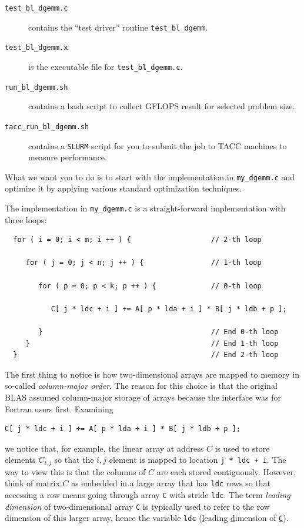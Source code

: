 \begin{description}
\begin{description}
\item[{\tt test\_bl\_dgemm.c}] contains the ``test driver'' routine {\tt test\_bl\_dgemm}. 
\item[{\tt test\_bl\_dgemm.x}] is the executable file for {\tt test\_bl\_dgemm.c}. 
\item[{\tt run\_bl\_dgemm.sh}] contains a bash script to collect GFLOPS result for selected problem size.
\item[{\tt tacc\_run\_bl\_dgemm.sh}] contains a {\tt SLURM} script for you to submit the job to TACC machines to measure performance.
\end{description}
\item[{\tt }]
\end{description}



What we want you to do is to start with the implementation in {\tt my\_dgemm.c} and optimize it by applying various standard optimization techniques.



The implementation in {\tt my\_dgemm.c} is a straight-forward implementation with three loops:
\begin{verbatim}
  for ( i = 0; i < m; i ++ ) {                   // 2-th loop
  
     for ( j = 0; j < n; j ++ ) {                // 1-th loop
  
        for ( p = 0; p < k; p ++ ) {             // 0-th loop
  
           C[ j * ldc + i ] += A[ p * lda + i ] * B[ j * ldb + p ];
  
        }                                        // End 0-th loop
     }                                           // End 1-th loop
  }                                              // End 2-th loop
\end{verbatim}
The first thing to notice is how two-dimensional arrays are mapped to memory in so-called {\em column-major order}.  The reason for this choice is that the original BLAS assumed column-major storage of arrays because the interface was for Fortran users first.  
Examining
\begin{verbatim}
C[ j * ldc + i ] += A[ p * lda + i ] * B[ j * ldb + p ];
\end{verbatim}
we notice that, for example, the linear array at address $ C $ is used to store elements $ C_{i,j} $ so that the $ i,j $ element is mapped to location {\tt j * ldc + i}.  The way to view this is that the columns of $ C $ are each stored contiguously.  However, think of matrix $ C $ as embedded in a large array that has {\tt ldc} rows so that accessing a row means going through array {\tt C} with stride {\tt ldc}.  The term {\em leading dimension} of two-dimensional array {\tt C} is typically used to refer to the row dimension of this larger array, hence the variable {\tt ldc} (\underline{l}eading \underline{d}imension of \underline{\tt C}).

